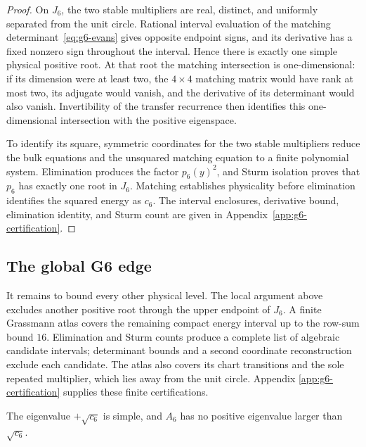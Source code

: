 \begin{proof}
On \(J_6\), the two stable multipliers are real, distinct, and uniformly
separated from the unit circle. Rational interval evaluation of the matching
determinant~\eqref{eq:g6-evans} gives opposite endpoint signs,
and its derivative has a fixed nonzero sign throughout the interval.
Hence there is exactly one simple physical positive root.
At that root the matching intersection is one-dimensional: if its dimension
were at least two, the \(4\times4\) matching matrix would have rank at most
two, its adjugate would vanish, and the derivative of its determinant would
also vanish.  Invertibility of the transfer recurrence then identifies this
one-dimensional intersection with the positive eigenspace.

To identify its square, symmetric coordinates for the two stable
multipliers reduce the bulk equations and the unsquared matching equation
to a finite polynomial system. Elimination produces the factor
\(p_6(y)^2\), and Sturm isolation proves that \(p_6\) has exactly one root in
\(J_6\). Matching establishes physicality before elimination identifies the
squared energy as \(c_6\). The interval
enclosures, derivative bound, elimination identity, and Sturm count are
given in Appendix~\ref{app:g6-certification}.
\end{proof}

\subsection{The global G6 edge}
\label{subsec:global-g6-edge}

It remains to bound every other physical level. The local argument above
excludes another positive root through the upper endpoint of \(J_6\).
A finite Grassmann atlas covers the remaining compact energy interval up to
the row-sum bound \(16\). Elimination and Sturm counts produce a complete
list of algebraic candidate intervals; determinant bounds and a second
coordinate reconstruction exclude each candidate.
The atlas also covers its chart transitions and the sole repeated
multiplier, which lies away from the unit circle. Appendix
\ref{app:g6-certification} supplies these finite certifications.

\begin{proposition}
\label{prop:g6-positive-completeness}
The eigenvalue \(+\sqrt{c_6}\) is simple, and \(A_6\) has no positive
eigenvalue larger than \(\sqrt{c_6}\).
\end{proposition}

